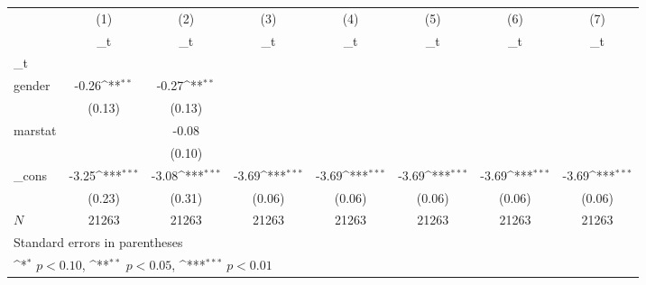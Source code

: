\documentclass{article}
\begin{document}
{
\def\sym#1{\ifmmode^{#1}\else\(^{#1}\)\fi}
\begin{tabular}{l*{7}{c}}
\hline\hline
            &\multicolumn{1}{c}{(1)}&\multicolumn{1}{c}{(2)}&\multicolumn{1}{c}{(3)}&\multicolumn{1}{c}{(4)}&\multicolumn{1}{c}{(5)}&\multicolumn{1}{c}{(6)}&\multicolumn{1}{c}{(7)}\\
            &\multicolumn{1}{c}{\_t}&\multicolumn{1}{c}{\_t}&\multicolumn{1}{c}{\_t}&\multicolumn{1}{c}{\_t}&\multicolumn{1}{c}{\_t}&\multicolumn{1}{c}{\_t}&\multicolumn{1}{c}{\_t}\\
\hline
\_t          &                     &                     &                     &                     &                     &                     &                     \\
gender      &       -0.26\sym{**} &       -0.27\sym{**} &                     &                     &                     &                     &                     \\
            &      (0.13)         &      (0.13)         &                     &                     &                     &                     &                     \\
[1em]
marstat     &                     &       -0.08         &                     &                     &                     &                     &                     \\
            &                     &      (0.10)         &                     &                     &                     &                     &                     \\
[1em]
\_cons      &       -3.25\sym{***}&       -3.08\sym{***}&       -3.69\sym{***}&       -3.69\sym{***}&       -3.69\sym{***}&       -3.69\sym{***}&       -3.69\sym{***}\\
            &      (0.23)         &      (0.31)         &      (0.06)         &      (0.06)         &      (0.06)         &      (0.06)         &      (0.06)         \\
\hline
\(N\)       &       21263         &       21263         &       21263         &       21263         &       21263         &       21263         &       21263         \\
\hline\hline
\multicolumn{8}{l}{\footnotesize Standard errors in parentheses}\\
\multicolumn{8}{l}{\footnotesize \sym{*} \(p<0.10\), \sym{**} \(p<0.05\), \sym{***} \(p<0.01\)}\\
\end{tabular}
}
\end{document}
